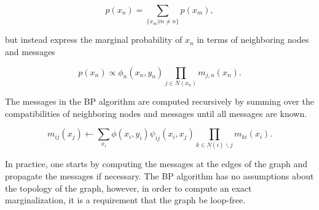 \documentclass[11pt]{article}
\begin{document}
\begin{equation*}
	p(x_n) = \sum_{\{x_m \vert m \neq n\}} p(x_m),
\end{equation*}

but instead express the marginal probability of $x_n$ in terms of neighboring nodes and messages

\begin{equation*}
	p(x_n) \propto \phi_n(x_n, y_n) \prod_{j \in N(x_n)} m_{j,n}(x_n).
\end{equation*}

The messages in the BP algorithm are computed recursively by summing over the compatibilities of neighboring nodes and messages until all messages are known.

\begin{equation*}
	m_{ij}(x_j) \leftarrow \sum_{x_i} \phi(x_i, y_i) \psi_{ij}(x_i, x_j) \prod_{k \in N(i) \backslash j} m_{ki}(x_i).
\end{equation*}

In practice, one starts by computing the messages at the edges of the graph and propagate the messages if necessary. The BP algorithm has no assumptions about the topology of the graph, however, in order to compute an exact marginalization, it is a requirement that the graph be loop-free.
\end{document}
